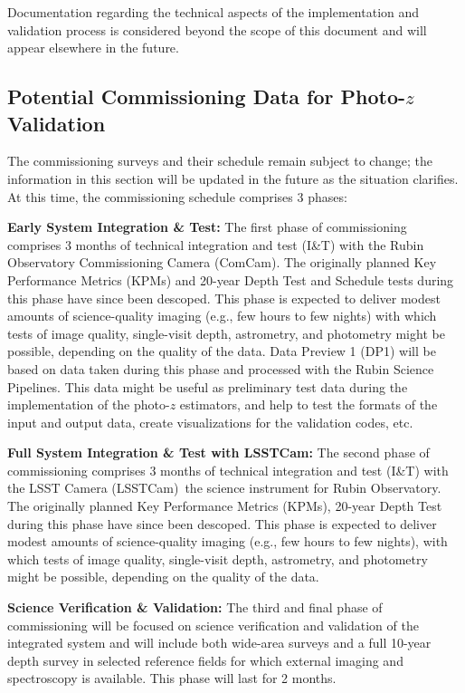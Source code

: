 \documentclass[DM,authoryear,toc]{lsstdoc}
\begin{document}
\begin{enumerate}
Documentation regarding the technical aspects of the implementation and validation process is considered beyond the scope of this document and will appear elsewhere in the future.

\subsection{Potential Commissioning Data for Photo-$z$ Validation}\label{ssec:pzcoop_commissioning}

The commissioning surveys and their schedule remain subject to change; the information in this section will be updated in the future as the situation clarifies.
At this time, the commissioning schedule comprises 3 phases: 

{\bf Early System Integration \& Test:}
The first phase of commissioning comprises 3 months of technical integration and test (I\&T) with the Rubin Observatory Commissioning Camera (ComCam).
The originally planned Key Performance Metrics (KPMs) and 20-year Depth Test and Schedule tests during this phase have since been descoped. 
This phase is expected to deliver modest amounts of science-quality imaging (e.g., few hours to few nights) with which tests of image quality, single-visit depth, astrometry, and photometry might be possible, depending on the quality of the data.  
Data Preview 1 (DP1) will be based on data taken during this phase and processed with the Rubin Science Pipelines. 
This data might be useful as preliminary test data during the implementation of the photo-$z$ estimators, and help to test the formats of the input and output data, create visualizations for the validation codes, etc.

{\bf Full System Integration \& Test with LSSTCam:}
The second phase of commissioning comprises 3 months of technical integration and test (I\&T) with  the LSST Camera (LSSTCam) \textemdash \,the science instrument for Rubin Observatory. 
The originally planned Key Performance Metrics (KPMs), 20-year Depth Test during this phase have since been descoped. 
This phase is expected to deliver modest amounts of science-quality imaging (e.g., few hours to few nights), with which tests of image quality, single-visit depth, astrometry, and photometry might be possible, depending on the quality of the data. 

{\bf Science Verification \& Validation:}
The third and final phase of commissioning will be focused on science verification and validation of the integrated system and will include both wide-area surveys and a full 10-year depth survey in selected reference fields for which external imaging and spectroscopy is available. 
This phase will last for 2 months. 


\end{enumerate}
\end{document}
